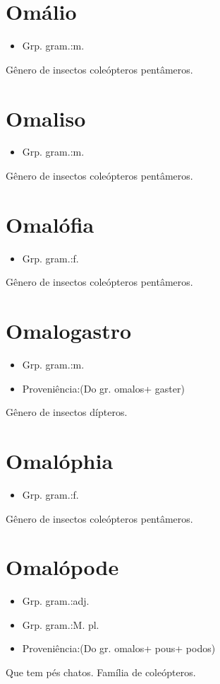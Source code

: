 \section{Omálio}
\begin{itemize}
\item {Grp. gram.:m.}
\end{itemize}
Gênero de insectos coleópteros pentâmeros.
\section{Omaliso}
\begin{itemize}
\item {Grp. gram.:m.}
\end{itemize}
Gênero de insectos coleópteros pentâmeros.
\section{Omalófia}
\begin{itemize}
\item {Grp. gram.:f.}
\end{itemize}
Gênero de insectos coleópteros pentâmeros.
\section{Omalogastro}
\begin{itemize}
\item {Grp. gram.:m.}
\end{itemize}
\begin{itemize}
\item {Proveniência:(Do gr. \textunderscore omalos\textunderscore  + \textunderscore gaster\textunderscore )}
\end{itemize}
Gênero de insectos dípteros.
\section{Omalóphia}
\begin{itemize}
\item {Grp. gram.:f.}
\end{itemize}
Gênero de insectos coleópteros pentâmeros.
\section{Omalópode}
\begin{itemize}
\item {Grp. gram.:adj.}
\end{itemize}
\begin{itemize}
\item {Grp. gram.:M. pl.}
\end{itemize}
\begin{itemize}
\item {Proveniência:(Do gr. \textunderscore omalos\textunderscore  + \textunderscore pous\textunderscore  + \textunderscore podos\textunderscore )}
\end{itemize}
Que tem pés chatos.
Família de coleópteros.
